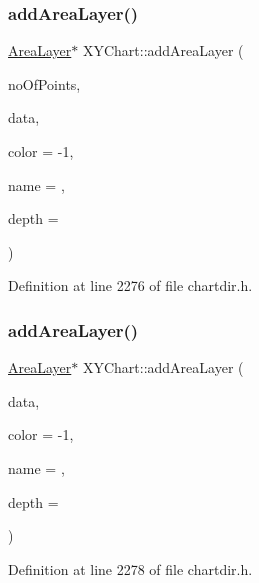 \subsubsection{\texorpdfstring{add\+Area\+Layer()}{addAreaLayer()}\hspace{0.1cm}{\footnotesize\ttfamily [1/3]}}
{\footnotesize\ttfamily \hyperlink{class_area_layer}{Area\+Layer}$\ast$ X\+Y\+Chart\+::add\+Area\+Layer (\begin{DoxyParamCaption}\item[{int}]{no\+Of\+Points,  }\item[{const double $\ast$}]{data,  }\item[{int}]{color = {\ttfamily -\/1},  }\item[{const char $\ast$}]{name = {},  }\item[{int}]{depth = {} }\end{DoxyParamCaption})\hspace{0.3cm}{\ttfamily [inline]}}



Definition at line 2276 of file chartdir.\+h.

\mbox{\label{class_x_y_chart_a3e5ffb6b63ea2705ac0a84518a3462fd}} 
\subsubsection{\texorpdfstring{add\+Area\+Layer()}{addAreaLayer()}\hspace{0.1cm}{\footnotesize\ttfamily [2/3]}}
{\footnotesize\ttfamily \hyperlink{class_area_layer}{Area\+Layer}$\ast$ X\+Y\+Chart\+::add\+Area\+Layer (\begin{DoxyParamCaption}\item[{\hyperlink{class_double_array}{Double\+Array}}]{data,  }\item[{int}]{color = {\ttfamily -\/1},  }\item[{const char $\ast$}]{name = {},  }\item[{int}]{depth = {} }\end{DoxyParamCaption})\hspace{0.3cm}{\ttfamily [inline]}}



Definition at line 2278 of file chartdir.\+h.

